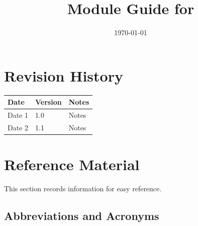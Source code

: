 \documentclass[12pt, titlepage]{article}
\begin{document}
\title{Module Guide for \progname{}}
\author{\authname}
\date{\today}

\maketitle


\section{Revision History}

\begin{tabularx}{\textwidth}{p{3cm}p{2cm}X}
\toprule {\bf Date} & {\bf Version} & {\bf Notes}\\
\midrule
Date 1 & 1.0 & Notes\\
Date 2 & 1.1 & Notes\\
\bottomrule
\end{tabularx}

\newpage

\section{Reference Material}

This section records information for easy reference.

\subsection{Abbreviations and Acronyms}
\end{document}
